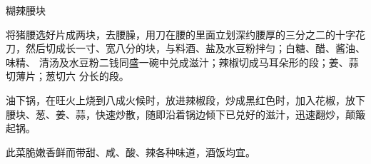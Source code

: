 %
%
%
%
%
%
%
\begin{recipe}[宫保腰块]{糊辣腰块}

\ingredients


\preparation

\step 将猪腰选好片成两块，去腰臊，用刀在腰的里面立划深约腰厚的三分之二的十字花
刀，然后切成长一寸、宽八分的块，与料酒、盐及水豆粉拌匀；白糖、醋、酱油、味精、
清汤及水豆粉二钱同盛一碗中兑成滋汁；辣椒切成马耳朵形的段；姜、蒜切薄片；葱切六
分长的段。

\step 油下锅，在旺火上烧到八成火候时，放进辣椒段，炒成黑红色时，加入花椒，放下
腰块、葱、姜、蒜，快速炒散，随即沿着锅边倾下已兑好的滋汁，迅速翻炒，颠簸起锅。

\features

此菜脆嫩香鲜而带甜、咸、酸、辣各种味道，酒饭均宜。

\end{recipe}

